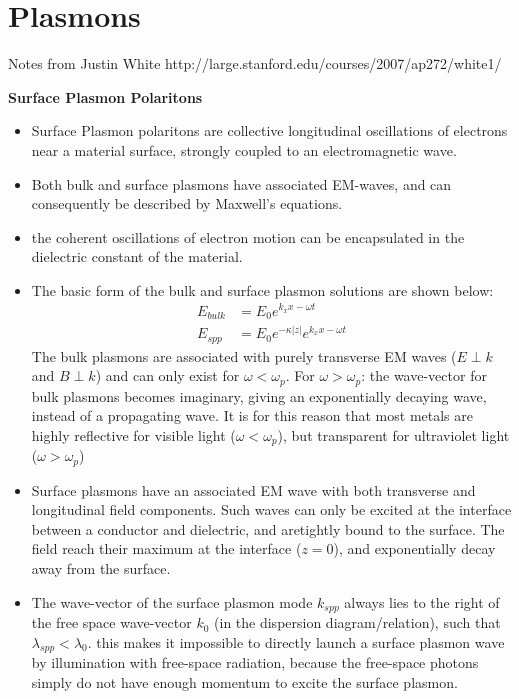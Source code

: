 \section{Plasmons}
Notes from Justin White 
http://large.stanford.edu/courses/2007/ap272/white1/

\textbf{Surface Plasmon Polaritons}
\begin{itemize}
\item
Surface Plasmon polaritons are collective longitudinal oscillations
of electrons near a material surface, strongly coupled to 
an electromagnetic wave.

\item 
Both bulk and surface plasmons have associated EM-waves, and can
consequently be described by Maxwell's equations. 

\item 
the coherent oscillations of electron motion can be encapsulated in
the dielectric constant of the material. 

\item
The basic form of the bulk and surface plasmon solutions are shown
below:
\begin{align}
E_{bulk} &= E_0 e^{k_x x - \omega t}\\
E_{spp} &= E_0e^{-\kappa |z|} e^{k_x x - \omega t}
\end{align}
The bulk plasmons are associated with purely transverse EM waves
($E\perp k$ and  $B \perp k$) and can only exist for 
$\omega < \omega_p$. 
For $\omega > \omega_p$: the wave-vector for bulk plasmons becomes
imaginary, giving an exponentially decaying wave, instead of a 
propagating wave. It is for this reason that most metals 
are highly reflective for visible light ($\omega <\omega_p$),
but transparent for ultraviolet light ($\omega > \omega_p$)

\item
Surface plasmons have an associated EM wave with both transverse 
and longitudinal field components. Such waves can only be excited
at the interface between a conductor and dielectric, and aretightly bound to the surface. The field reach their maximum at the interface 
($z=0$), and exponentially decay away from the surface.

\item 
The wave-vector of the surface plasmon mode $k_{spp}$ always lies
to the right of the free space wave-vector $k_0$ (in the dispersion 
diagram/relation), such that $\lambda_{spp} < \lambda_0$. this makes
 it impossible to directly launch a surface plasmon wave by
illumination with free-space radiation, because the free-space photons
simply do not have enough momentum to excite the surface plasmon.


\end{itemize}
